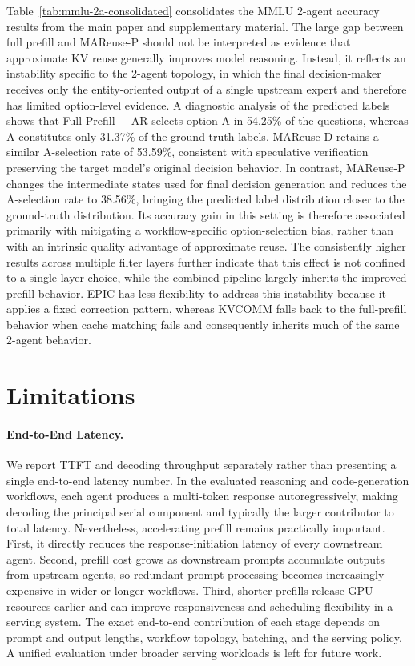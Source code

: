 \documentclass[letterpaper]{article} %
\begin{document}
Table~\ref{tab:mmlu-2a-consolidated} consolidates the MMLU 2-agent accuracy results from the main paper and supplementary material. The large gap between full prefill and MAReuse-P should not be interpreted as evidence that approximate KV reuse generally improves model reasoning. Instead, it reflects an instability specific to the 2-agent topology, in which the final decision-maker receives only the entity-oriented output of a single upstream expert and therefore has limited option-level evidence. A diagnostic analysis of the predicted labels shows that Full Prefill + AR selects option A in 54.25\% of the questions, whereas A constitutes only 31.37\% of the ground-truth labels. MAReuse-D retains a similar A-selection rate of 53.59\%, consistent with speculative verification preserving the target model's original decision behavior. In contrast, MAReuse-P changes the intermediate states used for final decision generation and reduces the A-selection rate to 38.56\%, bringing the predicted label distribution closer to the ground-truth distribution. Its accuracy gain in this setting is therefore associated primarily with mitigating a workflow-specific option-selection bias, rather than with an intrinsic quality advantage of approximate reuse. The consistently higher results across multiple filter layers further indicate that this effect is not confined to a single layer choice, while the combined pipeline largely inherits the improved prefill behavior. EPIC has less flexibility to address this instability because it applies a fixed correction pattern, whereas KVCOMM falls back to the full-prefill behavior when cache matching fails and consequently inherits much of the same 2-agent behavior.

\section{Limitations}

\paragraph{End-to-End Latency.}
We report TTFT and decoding throughput separately rather than presenting a single end-to-end latency number. In the evaluated reasoning and code-generation workflows, each agent produces a multi-token response autoregressively, making decoding the principal serial component and typically the larger contributor to total latency. Nevertheless, accelerating prefill remains practically important. First, it directly reduces the response-initiation latency of every downstream agent. Second, prefill cost grows as downstream prompts accumulate outputs from upstream agents, so redundant prompt processing becomes increasingly expensive in wider or longer workflows. Third, shorter prefills release GPU resources earlier and can improve responsiveness and scheduling flexibility in a serving system. The exact end-to-end contribution of each stage depends on prompt and output lengths, workflow topology, batching, and the serving policy. A unified evaluation under broader serving workloads is left for future work.
\end{document}
